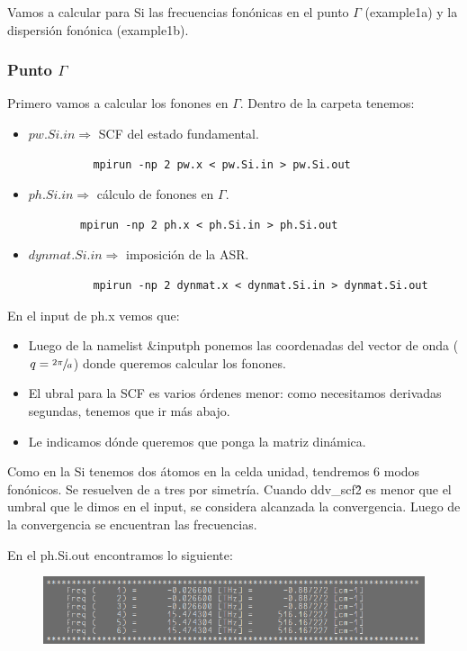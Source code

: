   Vamos a calcular para Si las frecuencias fonónicas en el punto $\Gamma$ (example1a) y la dispersión fonónica (example1b).

\subsubsection{Punto $\Gamma$}

  Primero vamos a calcular los fonones en $\Gamma$. Dentro de la carpeta tenemos:
    \begin{itemize}
      \item $pw.Si.in \Rightarrow$ SCF del estado fundamental.
        \begin{verbatim}
          mpirun -np 2 pw.x < pw.Si.in > pw.Si.out
        \end{verbatim}
      \item $ph.Si.in \Rightarrow$ cálculo de fonones en $\Gamma$.
      \begin{verbatim}
        mpirun -np 2 ph.x < ph.Si.in > ph.Si.out
      \end{verbatim}
      \item $dynmat.Si.in \Rightarrow$ imposición de la ASR.
      \begin{verbatim}
          mpirun -np 2 dynmat.x < dynmat.Si.in > dynmat.Si.out
      \end{verbatim}
    \end{itemize}

  En el input de ph.x vemos que:
    \begin{itemize}
      \item Luego de la namelist \&inputph ponemos las coordenadas del vector de onda ($q=\sfrac{2\pi}{a}$) donde queremos calcular los fonones.
      \item El ubral para la SCF es varios órdenes menor: como necesitamos derivadas segundas, tenemos que ir más abajo.
      \item Le indicamos dónde queremos que ponga la matriz dinámica.
    \end{itemize}

  Como en la Si tenemos dos átomos en la celda unidad, tendremos 6 modos fonónicos. Se resuelven de a tres por simetría. Cuando ddv\_scf\^2 es menor que el umbral que le dimos en el input, se considera alcanzada la convergencia. Luego de la convergencia se encuentran las frecuencias.

  En el ph.Si.out encontramos lo siguiente:
  \begin{figure}[H]
    \centering
    \includegraphics[scale = 0.6]{figs/D5/Si_ph.png}
  \end{figure}

